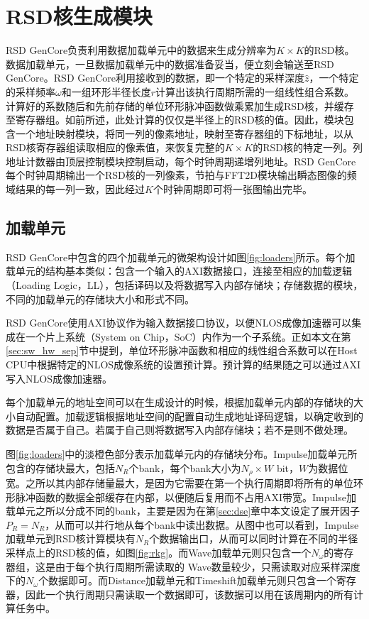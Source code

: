 \documentclass[master]{shtthesis}             %
\begin{document}
\section{RSD核生成模块}\label{sec:rsdgencore}

RSD GenCore负责利用数据加载单元中的数据来生成分辨率为$K\times K$的RSD核。数据加载单元，一旦数据加载单元中的数据准备妥当，便立刻会输送至RSD GenCore。RSD GenCore利用接收到的数据，即一个特定的采样深度$\hat{z}$，一个特定的采样频率$\omega$和一组环形半径长度$r$计算出该执行周期所需的一组线性组合系数。计算好的系数随后和先前存储的单位环形脉冲函数做乘累加生成RSD核，并缓存至寄存器组。如前所述，此处计算的仅仅是半径上的RSD核的值。因此，模块包含一个地址映射模块，将同一列的像素地址，映射至寄存器组的下标地址，以从RSD核寄存器组读取相应的像素值，来恢复完整的$K\times K$的RSD核的特定一列。列地址计数器由顶层控制模块控制启动，每个时钟周期递增列地址。RSD GenCore每个时钟周期输出一个RSD核的一列像素，节拍与FFT2D模块输出瞬态图像的频域结果的每一列一致，因此经过$K$个时钟周期即可将一张图输出完毕。

\subsection{加载单元}

RSD GenCore中包含的四个加载单元的微架构设计如图\ref{fig:loaders}所示。每个加载单元的结构基本类似：包含一个输入的AXI数据接口，连接至相应的加载逻辑（Loading Logic，LL），包括译码以及将数据写入内部存储块；存储数据的模块，不同的加载单元的存储块大小和形式不同。

RSD GenCore使用AXI协议作为输入数据接口协议，以便NLOS成像加速器可以集成在一个片上系统（System on Chip，SoC）内作为一个子系统。正如本文在第\ref{sec:sw_hw_sep}节中提到，单位环形脉冲函数和相应的线性组合系数可以在Host CPU中根据特定的NLOS成像系统的设置预计算。预计算的结果随之可以通过AXI写入NLOS成像加速器。

每个加载单元的地址空间可以在生成设计的时候，根据加载单元内部的存储块的大小自动配置。加载逻辑根据地址空间的配置自动生成地址译码逻辑，以确定收到的数据是否属于自己。若属于自己则将数据写入内部存储块；若不是则不做处理。

图\ref{fig:loaders}中的淡橙色部分表示加载单元内的存储块分布。Impulse加载单元所包含的存储块最大，包括$N_R$个bank，每个bank大小为$N_\rho\times W$ bit，$W$为数据位宽。之所以其内部存储量最大，是因为它需要在第一个执行周期即将所有的单位环形脉冲函数的数据全部缓存在内部，以便随后复用而不占用AXI带宽。Impulse加载单元之所以分成不同的bank，主要是因为在第\ref{sec:dse}章中本文设定了展开因子$P_R=N_R$，从而可以并行地从每个bank中读出数据。从图中也可以看到，Impulse加载单元到RSD核计算模块有$N_R$个数据输出口，从而可以同时计算在不同的半径采样点上的RSD核的值，如图\ref{fig:rkg}。而Wave加载单元则只包含一个$N_\omega$的寄存器组，这是由于每个执行周期所需读取的 Wave数量较少，只需读取对应采样深度下的$N_\omega$个数据即可。而Distance加载单元和Timeshift加载单元则只包含一个寄存器，因此一个执行周期只需读取一个数据即可，该数据可以用在该周期内的所有计算任务中。
\end{document}
